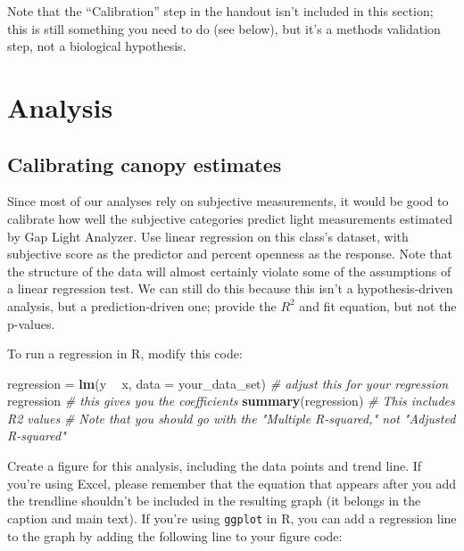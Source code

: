 \documentclass[]{book}
\newenvironment{Shaded}{\begin{snugshade}}{\end{snugshade}}
\newcommand{\KeywordTok}[1]{\textcolor[rgb]{0.13,0.29,0.53}{\textbf{#1}}}
\newcommand{\DataTypeTok}[1]{\textcolor[rgb]{0.13,0.29,0.53}{#1}}
\newcommand{\StringTok}[1]{\textcolor[rgb]{0.31,0.60,0.02}{#1}}
\newcommand{\CommentTok}[1]{\textcolor[rgb]{0.56,0.35,0.01}{\textit{#1}}}
\newcommand{\OperatorTok}[1]{\textcolor[rgb]{0.81,0.36,0.00}{\textbf{#1}}}
\newcommand{\NormalTok}[1]{#1}
\begin{document}
Note that the ``Calibration'' step in the handout isn't included in this
section; this is still something you need to do (see below), but it's a
methods validation step, not a biological hypothesis.

\section{Analysis}\label{analysis}

\subsection{Calibrating canopy
estimates}\label{calibrating-canopy-estimates}

Since most of our analyses rely on subjective measurements, it would be
good to calibrate how well the subjective categories predict light
measurements estimated by Gap Light Analyzer. Use linear regression on
this class's dataset, with subjective score as the predictor and percent
openness as the response. Note that the structure of the data will
almost certainly violate some of the assumptions of a linear regression
test. We can still do this because this isn't a hypothesis-driven
analysis, but a prediction-driven one; provide the \(R^2\) and fit
equation, but not the p-values.

To run a regression in R, modify this code:

\begin{Shaded}
\begin{Highlighting}[]
\NormalTok{regression =}\StringTok{ }\KeywordTok{lm}\NormalTok{(y }\OperatorTok{~}\StringTok{ }\NormalTok{x, }\DataTypeTok{data =}\NormalTok{ your_data_set) }\CommentTok{# adjust this for your regression}
\NormalTok{regression }\CommentTok{# this gives you the coefficients}
\KeywordTok{summary}\NormalTok{(regression) }\CommentTok{# This includes R2 values}
\CommentTok{# Note that you should go with the "Multiple R-squared," not "Adjusted R-squared"}
\end{Highlighting}
\end{Shaded}

Create a figure for this analysis, including the data points and trend
line. If you're using Excel, please remember that the equation that
appears after you add the trendline shouldn't be included in the
resulting graph (it belongs in the caption and main text). If you're
using \texttt{ggplot} in R, you can add a regression line to the graph
by adding the following line to your figure code:
\end{document}
